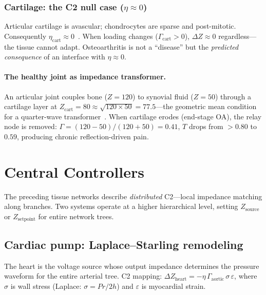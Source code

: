 \documentclass[aps,pre,twocolumn,superscriptaddress,floatfix]{revtex4-2}
\begin{document}
\subsubsection{Cartilage: the C2 null case ($\eta \approx 0$)}

Articular cartilage is avascular; chondrocytes are sparse
and post-mitotic.  Consequently $\eta_{\text{cart}}
\approx 0$~\cite{Buckwalter2004}.
When loading changes ($\Gamma_{\text{cart}} > 0$),
$\Delta Z \approx 0$ regardless---the tissue cannot adapt.
Osteoarthritis is not a ``disease'' but the
\emph{predicted consequence} of an interface with
$\eta \approx 0$.

\paragraph{The healthy joint as impedance transformer.}
An articular joint couples bone ($Z = 120$) to
synovial fluid ($Z = 50$) through a cartilage layer
at $Z_{\text{cart}} = 80 \approx \sqrt{120 \times 50}
= 77.5$---the geometric mean condition for a
quarter-wave transformer~\cite{Pozar2011}.
When cartilage erodes (end-stage OA), the relay node
is removed: $\Gamma = (120-50)/(120+50) = 0.41$,
$T$ drops from $>0.80$ to $0.59$, producing
chronic reflection-driven pain.


\section{Central Controllers}
\label{sec:controllers}

The preceding tissue networks describe \emph{distributed}
C2---local impedance matching along branches.
Two systems operate at a higher hierarchical level,
setting $Z_{\text{source}}$ or $Z_{\text{setpoint}}$
for entire network trees.

\subsection{Cardiac pump: Laplace--Starling remodeling}

The heart is the voltage source whose output impedance
determines the pressure waveform for the entire arterial
tree.  C2 mapping:
$\Delta Z_{\text{heart}} = -\eta\,\Gamma_{\text{aortic}}
\,\sigma\,\varepsilon$,
where $\sigma$ is wall stress (Laplace:
$\sigma = Pr/2h$) and $\varepsilon$ is myocardial strain.
\end{document}
